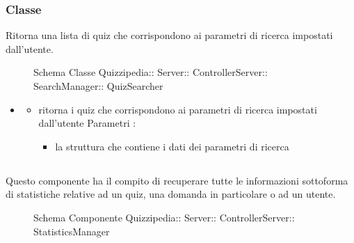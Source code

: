 \subsubsection{Classe }
Ritorna una lista di quiz che corrispondono ai parametri di ricerca impostati dall'utente.
\begin{figure}[H]
\centering
\noindent{}
\caption[Schema Classe QuizSearcher]{Schema Classe Quizzipedia:: Server:: ControllerServer:: SearchManager:: QuizSearcher}
\end{figure}
\begin{itemize}
\item {}
\begin{itemize}
\item {}
\newline
ritorna i quiz che corrispondono ai parametri di ricerca impostati dall'utente
\newline
Parametri :
\begin{itemize}
\item {}
\newline
la struttura che contiene i dati dei parametri di ricerca
\end{itemize}
\end{itemize}
\end{itemize}
\subsection{}
Questo componente ha il compito di recuperare tutte le informazioni sottoforma di statistiche relative ad un quiz, una domanda in particolare o ad un utente.
\begin{figure}[H]
\centering
\noindent{}
\caption[Schema Componente StatisticsManager]{Schema Componente Quizzipedia:: Server:: ControllerServer:: StatisticsManager}
\end{figure}
